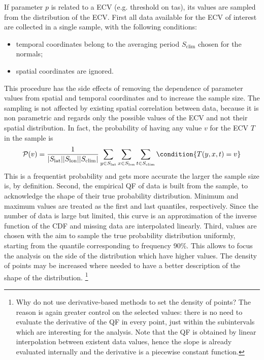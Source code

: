 If parameter $p$ is related to a \gls{ECV} (e.g. threshold on \gls{tas}), its values are sampled from the distribution of the \gls{ECV}. First all data available for the \gls{ECV} of interest are collected in a single sample, with the following conditions:
\begin{itemize}
  \item temporal coordinates belong to the averaging period $S_\text{clim}$ chosen for the \glspl{normal};
  \item spatial coordinates are ignored.
\end{itemize}
This procedure has the side effects of removing the dependence of parameter values from spatial and temporal coordinates and to increase the sample size. The sampling is not affected by existing spatial correlation between data, because it is non parametric and regards only the possible values of the \gls{ECV} and not their spatial distribution. In fact, the probability of having any value $v$ for the \gls{ECV} $T$ in the sample is
\begin{equation}
  \label{eq:variable_probability}
  \mathcal{P}(v) = \frac{1}{\abs{S_\text{lat}} \abs{S_\text{lon}} \abs{S_\text{clim}}} \sum_{y \in S_\text{lat}} \sum_{x \in S_\text{lon}} \sum_{t \in S_\text{clim}} \condition{T(y, x, t) = v}
\end{equation}
This is a frequentist probability and gets more accurate the larger the sample size is, by definition. %
Second, the empirical \gls{QF} of data is built from the sample, to acknowledge the shape of their true probability distribution. Minimum and maximum values are treated as the first and last quantiles, respectively. Since the number of data is large but limited, this curve is an approximation of the inverse function of the \gls{CDF} and missing data are interpolated linearly.
Third, values are chosen with the aim to sample the true probability distribution uniformly, starting from the quantile corresponding to frequency 90\%. This allows to focus the analysis on the side of the distribution which have higher values. The density of points may be increased where needed to have a better description of the shape of the distribution.%
\footnote{Why do not use derivative-based methods to set the density of points? The reason is again greater control on the selected values: there is no need to evaluate the derivative of the \gls{QF} in every point, just within the subintervals which are interesting for the analysis. Note that the \gls{QF} is obtained by linear interpolation between existent data values, hence the slope is already evaluated internally and the derivative is a piecewise constant function.}

